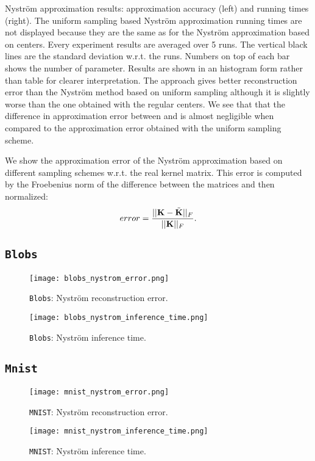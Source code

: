 Nystr\"om approximation results: approximation accuracy (left) and running times (right). The uniform sampling based Nyström approximation running times are not displayed because they are the same as for the Nyström approximation based on \kmeans centers. Every experiment results are averaged over 5 runs. The vertical black lines are the standard deviation w.r.t. the runs. Numbers on top of each bar shows the number of parameter.
Results are shown in an histogram form rather than table for clearer interpretation. The \qkmeans approach gives better reconstruction error than the Nyström method based on uniform sampling although it is slightly worse than the one obtained with the regular \kmeans centers. We see that that the difference in approximation error between \kmeans and \qkmeans is almost negligible when compared to the approximation error obtained with the uniform sampling scheme.


We show the approximation error of the Nyström approximation based on different sampling schemes w.r.t. the real kernel matrix. This error is computed by the Froebenius norm of the difference between the matrices and then normalized:
\begin{equation}
 error = \frac{||{\mathbf{K}} - \tilde{{\mathbf{K}}}||_F}{||{\mathbf{K}}||_F}.
\end{equation}


\subsection{\texttt{Blobs}           }
\begin{figure*}[h]
\begin{subfigure}[]{.49\textwidth}
\texttt{[image: blobs\_nystrom\_error.png]}
\caption{\texttt{Blobs}: Nyström reconstruction error.}
\label{fig:blobs:nystrom_error}
\end{subfigure}
\begin{subfigure}[]{.49\textwidth}
\texttt{[image: blobs\_nystrom\_inference\_time.png]}
\caption{\texttt{Blobs}: Nyström inference time.}
\label{fig:blobs:nystrom_time}
\end{subfigure}
\end{figure*}
\FloatBarrier
\subsection{\texttt{Mnist}           }
\begin{figure*}[h]
\begin{subfigure}[]{.49\textwidth}
\texttt{[image: mnist\_nystrom\_error.png]}
\caption{\texttt{MNIST}: Nyström reconstruction error.}
\label{fig:mnist:nystrom_error}
\end{subfigure}
\begin{subfigure}[]{.49\textwidth}
\texttt{[image: mnist\_nystrom\_inference\_time.png]}
\caption{\texttt{MNIST}: Nyström inference time.}
\label{fig:mnist:nystrom_time}
\end{subfigure}
\end{figure*}
\FloatBarrier
